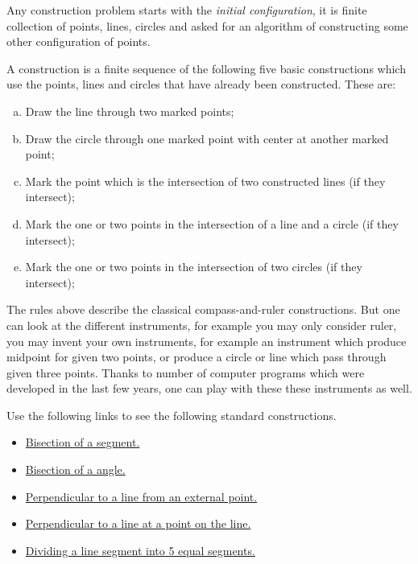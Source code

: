{Any construction problem starts with the \emph{initial configuration},
it is finite collection of points, lines, circles
and asked for an algorithm of constructing some other configuration of points.

A construction is a finite sequence of the following five basic constructions which use the points, lines and circles that have already been constructed. 
These are:
\begin{enumerate}[(a)]
\item Draw the line through two marked points;
\item Draw the circle through one marked point with center at another marked point;
\item Mark the point which is the intersection of two constructed lines (if they intersect);
\item Mark the one or two points in the intersection of a line and a circle (if they intersect);
\item Mark the one or two points in the intersection of two circles (if they intersect);
\end{enumerate}

The rules above describe the classical compass-and-ruler constructions. 
But one can look at the different instruments, for example
you may only consider ruler,
you may invent your own instruments, for example an instrument which produce midpoint for given two points, or produce a circle or line which pass through given three points.
Thanks to number of computer programs which were developed in the last few years, one can play with these these instruments as well. 


Use the following links to see the following standard constructions.
\begin{itemize}
\item \href{run:./car/segment-bisector.html}{Bisection of a segment.}
\item \href{run:./car/angle-bisector.html}{Bisection of a angle.}
\item \href{run:./car/perpendicular-1.html}{Perpendicular to a line from an external point.}
\item \href{run:./car/perpendicular-2.html}{Perpendicular to a line at a point on the line.}
\item \href{run:./car/5-sect.html}{Dividing a line segment into 5 equal segments.}
\end{itemize}

}
